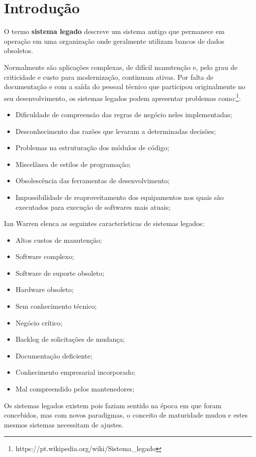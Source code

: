 \section{Introdução}
O termo \textbf{sistema legado} descreve um sistema antigo que permanece em operação em uma organização onde geralmente utilizam bancos de dados obsoletos.

Normalmente são aplicações complexas, de difícil manutenção e, pelo grau de criticidade e custo para modernização, continuam ativas. Por falta de documentação e com a saída do pessoal técnico que participou originalmente no seu desenvolvimento, os sistemas legados podem apresentar problemas como:\footnote{https://pt.wikipedia.org/wiki/Sistema\_legado}:
\begin{itemize}
    \item Dificuldade de compreensão das regras de negócio neles implementadas;
    \item Desconhecimento das razões que levaram a determinadas decisões;
    \item Problemas na estruturação dos módulos de código;
    \item Miscelânea de estilos de programação;
    \item Obsolescência das ferramentas de desenvolvimento;
    \item Impossibilidade de reaproveitamento dos equipamentos nos quais são executados para execução de softwares mais atuais;
\end{itemize}
Ian Warren elenca as seguintes características de sistemas legados:
\begin{itemize}
    \item Altos custos de manutenção;
    \item Software complexo;
    \item Software de suporte obsoleto;
    \item Hardware obsoleto;
    \item Sem conhecimento técnico;
    \item Negócio crítico;
    \item Backlog de solicitações de mudança;
    \item Documentação deficiente;
    \item Conhecimento empresarial incorporado;
    \item Mal compreendido pelos mantenedores;
\end{itemize}

Os sistemas legados existem pois faziam sentido na época em que foram concebidos, mas com novos paradigmas, o conceito de maturidade mudou e estes mesmos sistemas necessitam de ajustes.

